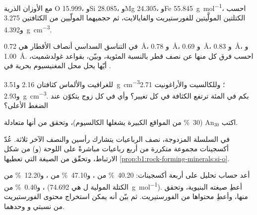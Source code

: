 \begin{exercise}[$\star$]\label{exo:b1:rock-forming-minerals:2}
مع الأوزان الذرية O \num{15.999}، وSi \num{28.085}، وMg \num{24.305}، وFe \qty{55.845}{g.mol^{-1}}، احسب الكتلتين المولَّيتين للفورستيريت والفايالايت، ثم حجميهما المولّيين من الكثافتين \num{3.275} و\qty{4.392}{g.cm^{-3}}.
\end{exercise}

\begin{exercise}[$\star$]\label{exo:b1:rock-forming-minerals:3}
في التناسق السداسي أنصاف الأقطار هي  \qty{0.72}{\angstrom}، و \qty{0.78}{\angstrom}، و \qty{0.69}{\angstrom}، و \qty{0.83}{\angstrom}، و \qty{1.00}{\angstrom}. احسب فرق كل منها عن نصف قطر  بالنسبة المئوية، وبيّن، بقواعد غولدشميت، أيّها يحل محل المغنيسيوم بحرية في .
\end{exercise}

\begin{exercise}[$\star$]\label{exo:b1:rock-forming-minerals:4}
للغرافيت والألماس كثافتان \num{2.16} و\qty{3.51}{g.cm^{-3}}؛ وللكالسيت والأراغونيت \num{2.71} و\qty{2.93}{g.cm^{-3}}. بكم في المئة ترتفع الكثافة في كل تغيير؟ وأي  في كل زوج يتكوّن عند الضغط الأعلى؟
\end{exercise}

\begin{exercise}[$\star\star$]\label{exo:b1:rock-forming-minerals:5}
اكتب   $\text{An}_{30}$ (\qty{30}{\percent} من المواقع الكبيرة يشغلها الكالسيوم)، وتحقق من أنها متعادلة.
\end{exercise}

\begin{exercise}[$\star\star$]\label{exo:b1:rock-forming-minerals:6}
في السلسلة المزدوجة، نصف الرباعيات يتشارك رأسين والنصف الآخر ثلاثة. عُدّ أكسجينات مجموعة متكررة من أربع رباعيات مباشرةً على اللوحة (و) من شكل الارتباط، وتحقّق من الصيغة  التي تعطيها \cref{prop:b1:rock-forming-minerals:si-o}.
\end{exercise}

\begin{exercise}[$\star\star$]\label{exo:b1:rock-forming-minerals:7}
أعد حساب تحليل  على أربعة أكسجينات: \qty{40.20}{\percent} من ، و\qty{47.10}{\percent} من ، و\qty{12.20}{\percent} من ، و\qty{0.40}{\percent} من  (الكتلة المولية ل هي \qty{74.692}{g.mol^{-1}}). أعطِ صيغته البنيوية، وتحقق منها، وأعطِ محتواها من الفورستيريت. ثم بيّن أنه يمكن استخراج محتوى الفورستيريت من نسبتي  و وحدهما.
\end{exercise}

